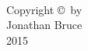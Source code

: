 \documentclass[11pt,oneside,a4paper,onecolumn]{article}                 %
\begin{document}
\pagebreak[4]



\thispagestyle{empty} %
\doublespacing
\begin{center}
\ \\
\ \\
\ \\
\ \\
\ \\
\ \\
\ \\
\ \\
\ \\
\ \\
\ \\
Copyright \copyright\ by\\
Jonathan Bruce\\
2015
\pagebreak[4]
\end{center}


\renewcommand\contentsname{Table of Contents} %
\tableofcontents %
\pagebreak[4]



\listoffigures %
\pagebreak[4]

\end{document}
